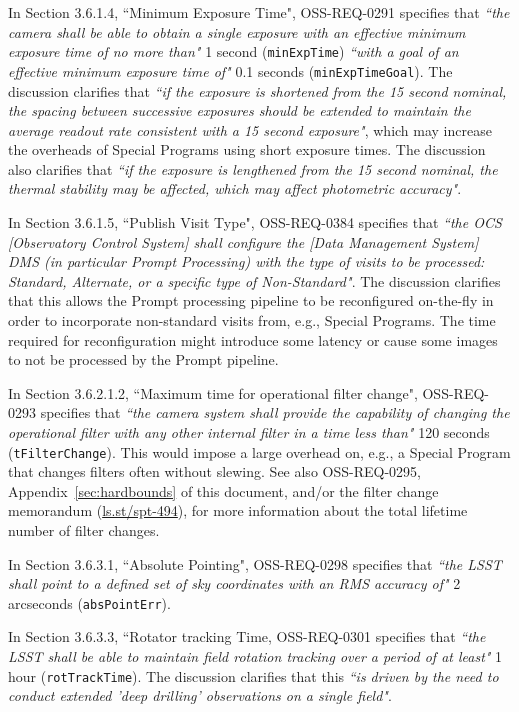 In Section 3.6.1.4, ``Minimum Exposure Time", OSS-REQ-0291 specifies that {\it ``the camera shall be 
able to obtain a single exposure with an effective minimum exposure time of no more than"} 1 second 
({\tt minExpTime}) {\it ``with a goal of an effective minimum exposure time of"} 0.1 seconds 
({\tt minExpTimeGoal}). 
The discussion clarifies that {\it ``if the exposure is shortened from the 15 second nominal, the spacing between 
successive exposures should be extended to maintain the average readout rate consistent with a 15 second exposure"}, 
which may increase the overheads of Special Programs using short exposure times.
The discussion also clarifies that {\it ``if the exposure is lengthened from the 15 second nominal, the thermal 
stability may be affected, which may affect photometric accuracy"}.

In Section 3.6.1.5, ``Publish Visit Type", OSS-REQ-0384 specifies that {\it ``the OCS [Observatory 
Control System] shall configure the [Data Management System] DMS (in particular Prompt Processing) with the type 
of visits to be processed: Standard, Alternate, or a specific type of Non-Standard"}.
The discussion clarifies that this allows the Prompt processing pipeline to be reconfigured on-the-fly in order to 
incorporate non-standard visits from, e.g., Special Programs.
The time required for reconfiguration might introduce some latency or cause some images to not be processed by the 
Prompt pipeline.

In Section 3.6.2.1.2, ``Maximum time for operational filter change", OSS-REQ-0293 specifies that 
{\it ``the camera system shall provide the capability of changing the operational filter with any other internal 
filter in a time less than"} 120 seconds ({\tt tFilterChange}).
This would impose a large overhead on, e.g., a Special Program that changes filters often without slewing.
See also OSS-REQ-0295, Appendix~\ref{sec:hardbounds} of this document, and/or the filter change 
memorandum (\url{ls.st/spt-494}), for more information about the total lifetime number of filter changes.

In Section 3.6.3.1, ``Absolute Pointing", OSS-REQ-0298 specifies that {\it ``the LSST shall point to 
a defined set of sky coordinates with an RMS accuracy of"} 2 arcseconds ({\tt absPointErr}).

In Section 3.6.3.3, ``Rotator tracking Time, OSS-REQ-0301 specifies that {\it ``the LSST shall be able 
to maintain field rotation tracking over a period of at least"} 1 hour ({\tt rotTrackTime}).
The discussion clarifies that this {\it ``is driven by the need to conduct extended 'deep drilling' observations on 
a single field"}.

